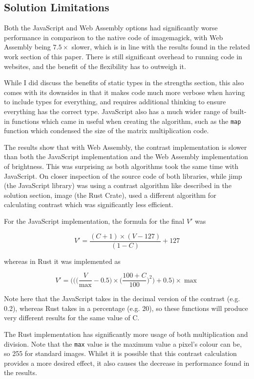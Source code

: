 \documentclass[12pt,a4paper]{article}
\begin{document}
\subsection{Solution Limitations}

Both the JavaScript and Web Assembly options had significantly worse performance in comparison to the native code of imagemagick, with Web Assembly being $7.5 \times$ slower, which is in line with the results found in the related work section of this paper. There is still significant overhead to running code in websites, and the benefit of the flexibility has to outweigh it.

While I did discuss the benefits of static types in the strengths section, this also comes with its downsides in that it makes code much more verbose when having to include types for everything, and requires additional thinking to ensure everything has the correct type. JavaScript also has a much wider range of built-in functions which came in useful when creating the algorithm, such as the \texttt{map} function which condensed the size of the matrix multiplication code.

The results show that with Web Assembly, the contrast implementation is slower than both the JavaScript implementation and the Web Assembly implementation of brightness. This was surprising as both algorithms took the same time with JavaScript. On closer inspection of the source code of both libraries, while jimp (the JavaScript library) was using a contrast algorithm like described in the solution section, image (the Rust Crate), used a different algorithm for calculating contrast which was significantly less efficient.

For the JavaScript implementation, the formula for the final $V'$ was

$$
    V'=\frac{(C+1)\times (V-127)}{(1-C)}+127
$$

whereas in Rust it was implemented as

$$
    V'=\bigg(\bigg(\bigg(\frac{V}{\max}-0.5)\times\bigg(\frac{100+C}{100}\bigg)^2\bigg)+0.5\bigg)\times \max
$$

Note here that the JavaScript takes in the decimal version of the contrast (e.g. 0.2), whereas Rust takes in a percentage (e.g. 20), so these functions will produce very different results for the same value of C.

The Rust implementation has significantly more usage of both multiplication and division. Note that the \texttt{max} value is the maximum value a pixel's colour can be, so 255 for standard images. Whilst it is possible that this contrast calculation provides a more desired effect, it also causes the decrease in performance found in the results.
\end{document}
